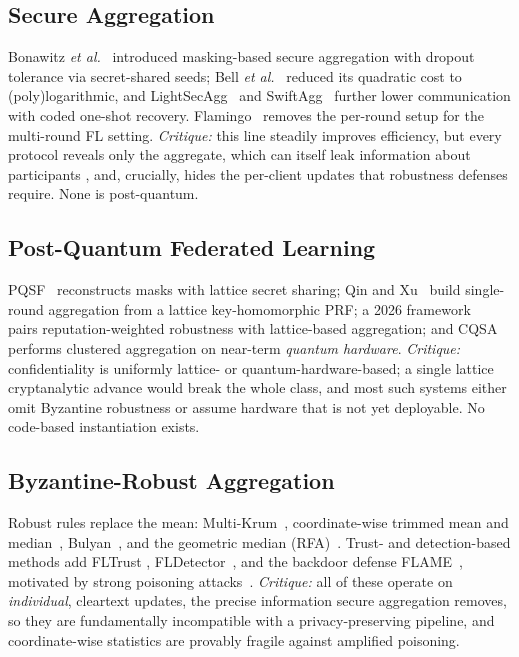 \documentclass[conference]{IEEEtran}
\begin{document}
\subsection{Secure Aggregation}
Bonawitz \emph{et al.}~\cite{bonawitz2017} introduced masking-based secure
aggregation with dropout tolerance via secret-shared seeds; Bell \emph{et
al.}~\cite{bell2020} reduced its quadratic cost to (poly)logarithmic, and
LightSecAgg~\cite{lightsecagg} and SwiftAgg~\cite{swiftagg} further lower
communication with coded one-shot recovery. Flamingo~\cite{flamingo} removes the
per-round setup for the multi-round FL setting. \emph{Critique:} this line steadily
improves efficiency, but every protocol reveals only the aggregate, which can itself
leak information about participants \cite{elkordy2022}, and, crucially, hides the
per-client updates that robustness defenses require. None is post-quantum.

\subsection{Post-Quantum Federated Learning}
PQSF~\cite{pqsf2024} reconstructs masks with lattice secret sharing; Qin and
Xu~\cite{qinxu2025} build single-round aggregation from a lattice key-homomorphic
PRF; a 2026 framework~\cite{byzpqfl2026} pairs reputation-weighted robustness with
lattice-based aggregation; and CQSA~\cite{cqsa2026} performs clustered aggregation on
near-term \emph{quantum hardware}. \emph{Critique:} confidentiality is uniformly
lattice- or quantum-hardware-based; a single lattice cryptanalytic advance would
break the whole class, and most such systems either omit Byzantine robustness or
assume hardware that is not yet deployable. No code-based instantiation exists.

\subsection{Byzantine-Robust Aggregation}
Robust rules replace the mean: Multi-Krum~\cite{blanchard2017}, coordinate-wise
trimmed mean and median~\cite{yin2018}, Bulyan~\cite{bulyan}, and the geometric
median (RFA)~\cite{rfa}. Trust- and detection-based methods add FLTrust
\cite{fltrust}, FLDetector~\cite{fldetector2022}, and the backdoor defense
FLAME~\cite{flame2022}, motivated by strong poisoning attacks~\cite{fang2020}.
\emph{Critique:} all of these operate on \emph{individual}, cleartext updates, the
precise information secure aggregation removes, so they are fundamentally
incompatible with a privacy-preserving pipeline, and coordinate-wise statistics are
provably fragile against amplified poisoning.
\end{document}
